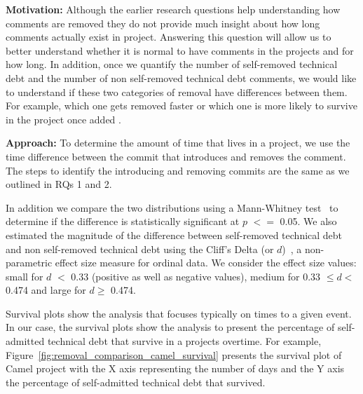 \noindent\rqiii

\noindent \textbf{Motivation:} Although the earlier research questions help understanding how \SATD comments are removed they do not provide much insight about how long \SATD comments actually exist in project. Answering this question will allow us to better understand whether it is normal to have \SATD comments in the projects and for how long. In addition, once we quantify the number of self-removed technical debt and the number of non self-removed technical debt comments, we would like to understand if these two categories of removal have differences between them. For example, which one gets removed faster or which one is more likely to survive in the project once added . 

\noindent \textbf{Approach:} To determine the amount of time that \SATD lives in a project, we use the time difference between the commit that introduces and removes the \SATD comment. The steps to identify the \SATD introducing and removing commits are the same as we outlined in RQs 1 and 2.



In addition we compare the two distributions using a Mann-Whitney test~\cite{mann1947test} to determine if the difference is statistically significant at $p$ $<$$=$ 0.05. We also estimated the magnitude of the difference between self-removed technical debt and non self-removed technical debt using the Cliff's Delta (or $d$)~\cite{grissom2005effect}, a
non-parametric effect size measure for ordinal data. We consider the effect size values: small for $d$ $<$ 0.33 (positive as well as negative values), medium for 0.33  $\leq d<$ 0.474 and large for $d \geq$ 0.474.




Survival plots show the analysis that focuses typically on times to a given event. In our case, the survival plots show the analysis to present the percentage of self-admitted technical debt that survive in a projects overtime. For example, Figure~\ref{fig:removal_comparison_camel_survival} presents the survival plot of Camel project with the X axis representing the number of days  and the Y axis the percentage of self-admitted technical debt that survived.

